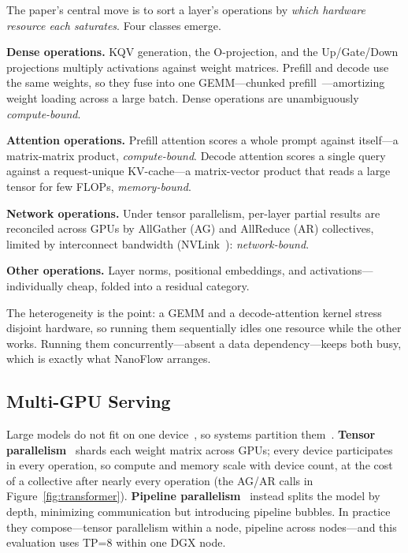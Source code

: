 \documentclass[manuscript,review]{acmart}
\newcommand{\nf}{NanoFlow\xspace}   %
\begin{document}
The paper's central move is to sort a layer's operations by \emph{which hardware resource each saturates}. 
Four classes emerge.

\textbf{Dense operations.} KQV generation, the O-projection, and the Up/Gate/Down projections multiply 
activations against weight matrices. Prefill and decode use the same weights, so they fuse into one 
GEMM---chunked prefill~\cite{agrawal2023sarathi}---amortizing weight loading across a large batch. Dense 
operations are unambiguously \emph{compute-bound}.

\textbf{Attention operations.} Prefill attention scores a whole prompt against itself---a matrix-matrix product, 
\emph{compute-bound}. Decode attention scores a single query against a request-unique KV-cache---a matrix-vector 
product that reads a large tensor for few FLOPs, \emph{memory-bound}.

\textbf{Network operations.} Under tensor parallelism, per-layer partial results are reconciled across GPUs by 
AllGather (AG) and AllReduce (AR) collectives, limited by interconnect bandwidth 
(NVLink~\cite{nvidia2024nvlink}): \emph{network-bound}.

\textbf{Other operations.} Layer norms, positional embeddings, and activations---individually cheap, folded into 
a residual category.

The heterogeneity is the point: a GEMM and a decode-attention kernel stress disjoint hardware, so running them 
sequentially idles one resource while the other works. Running them concurrently---absent a data 
dependency---keeps both busy, which is exactly what \nf arranges.
\subsection{Multi-GPU Serving}

Large models do not fit on one device~\cite{li2023alpaserve}, so systems partition 
them~\cite{he2022fastermoe, shoeybi2020megatron, zheng2022alpa}. 
\textbf{Tensor parallelism}~\cite{shoeybi2020megatron, zheng2022alpa} 
shards each weight matrix across GPUs; every device participates in every operation, so compute and memory 
scale with device count, at the cost of a collective after nearly every operation 
(the AG/AR calls in Figure~\ref{fig:transformer}). \textbf{Pipeline parallelism}~\cite{huang2019gpipe} 
instead splits the model by depth, minimizing communication but introducing pipeline bubbles. In practice they 
compose---tensor parallelism within a node, pipeline across nodes---and this evaluation uses TP=8 within one 
DGX node.
\end{document}
